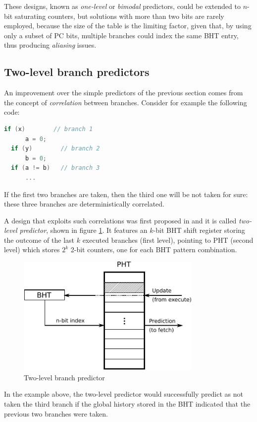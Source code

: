 These designs, known as \emph{one-level} or \emph{bimodal} predictors, could be extended to $n$-bit saturating counters, but solutions with more than two bits are rarely employed, because the size of the table is the limiting factor, given that, by using only a subset of \ac{PC} bits, multiple branches could index the same \ac{BHT} entry, thus producing \emph{aliasing} issues.

\subsection{Two-level branch predictors}\label{sec:twolevelbp}
An improvement over the simple predictors of the previous section comes from the concept of \emph{correlation} between branches. Consider for example the following code:
\begin{lstlisting}[language=C]
  if (x)        // branch 1
      a = 0;
  if (y)        // branch 2
      b = 0;
  if (a != b)   // branch 3
      ...
\end{lstlisting}
If the first two branches are taken, then the third one will be not taken for sure: these three branches are deterministically correlated.

A design that exploits such correlations was first proposed in \cite{yeh91} and it is called \emph{two-level predictor}, shown in figure \ref{fig:two-level-bp}. It features an $k$-bit \ac{BHT} shift register storing the outcome of the last $k$ executed branches (first level), pointing to \ac{PHT} (second level) which stores $2^k$ 2-bit counters, one for each \ac{BHT} pattern combination.
\begin{figure}[hbtp]
  \centering
  \includegraphics[width=0.8\textwidth]{img/two-level-bp.pdf}
  \caption[Two-level branch predictor]{Two-level branch predictor\footnotemark}
  \label{fig:two-level-bp}
\end{figure}
In the example above, the two-level predictor would successfully predict as not taken the third branch if the global history stored in the \ac{BHT} indicated that the previous two branches were taken.


